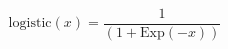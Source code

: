 \documentclass[preview]{standalone}
\begin{document}
\begin{equation}
\tag{7:def_logistic}
    \mathrm{logistic} ( x ) = \frac{1}{( 1 + \mathrm{Exp} ( - x ) )}
\end{equation}
\end{document}
